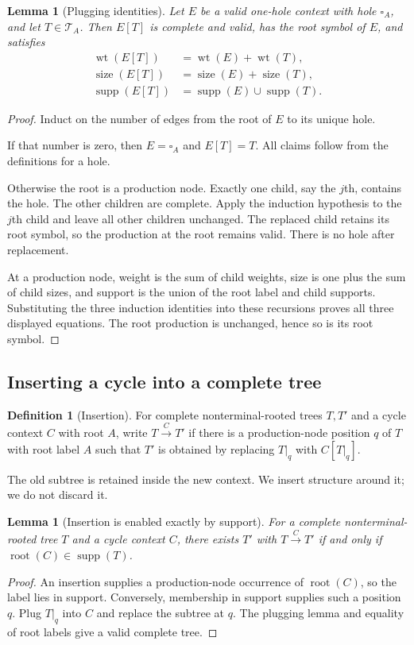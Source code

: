 \documentclass[11pt,a4paper]{article}
\numberwithin{equation}{section}
\theoremstyle{plain}
\newtheorem{lemma}[theorem]{Lemma}
\theoremstyle{definition}
\newtheorem{definition}[theorem]{Definition}
\theoremstyle{remark}
\newcommand{\wt}{\operatorname{wt}}
\newcommand{\supp}{\operatorname{supp}}
\newcommand{\rt}{\operatorname{root}}
\newcommand{\sz}{\operatorname{size}}
\newcommand{\Trees}{\mathcal T}
\newcommand{\hole}[1]{\square_{#1}}
\newcommand{\ins}[1]{\xrightarrow{\;#1\;}}
\begin{document}
\begin{lemma}[Plugging identities]\label{lem:plug}
Let $E$ be a valid one-hole context with hole $\hole{A}$, and let $T\in\Trees_A$. Then $E[T]$ is complete and valid, has the root symbol of $E$, and satisfies
\begin{align}
\wt(E[T])&=\wt(E)+\wt(T),\label{eq:plug-wt}\\
\sz(E[T])&=\sz(E)+\sz(T),\label{eq:plug-size}\\
\supp(E[T])&=\supp(E)\cup\supp(T).\label{eq:plug-supp}
\end{align}
\end{lemma}
\begin{proof}
Induct on the number of edges from the root of $E$ to its unique hole.

If that number is zero, then $E=\hole{A}$ and $E[T]=T$. All claims follow from the definitions for a hole.

Otherwise the root is a production node. Exactly one child, say the $j$th, contains the hole. The other children are complete. Apply the induction hypothesis to the $j$th child and leave all other children unchanged. The replaced child retains its root symbol, so the production at the root remains valid. There is no hole after replacement.

At a production node, weight is the sum of child weights, size is one plus the sum of child sizes, and support is the union of the root label and child supports. Substituting the three induction identities into these recursions proves all three displayed equations. The root production is unchanged, hence so is its root symbol.
\end{proof}

\subsection{Inserting a cycle into a complete tree}
\begin{definition}[Insertion]\label{def:insertion}
For complete nonterminal-rooted trees $T,T'$ and a cycle context $C$ with root $A$, write $T\ins C T'$ if there is a production-node position $q$ of $T$ with root label $A$ such that $T'$ is obtained by replacing $T|_q$ with $C[T|_q]$.
\end{definition}

The old subtree is retained inside the new context. We insert structure around it; we do not discard it.

\begin{lemma}[Insertion is enabled exactly by support]\label{lem:enabled}
For a complete nonterminal-rooted tree $T$ and a cycle context $C$, there exists $T'$ with $T\ins C T'$ if and only if $\rt(C)\in\supp(T)$.
\end{lemma}
\begin{proof}
An insertion supplies a production-node occurrence of $\rt(C)$, so the label lies in support. Conversely, membership in support supplies such a position $q$. Plug $T|_q$ into $C$ and replace the subtree at $q$. The plugging lemma and equality of root labels give a valid complete tree.
\end{proof}
\end{document}
